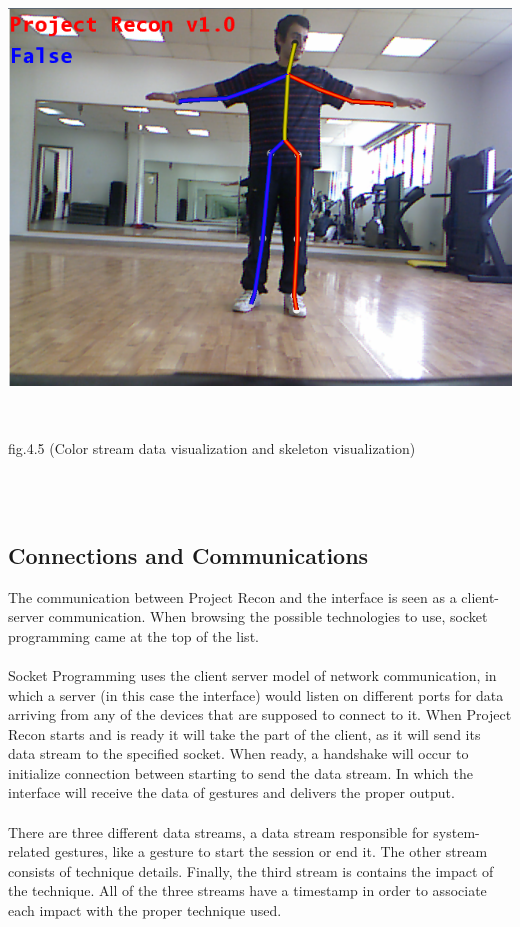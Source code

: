 \\
\\
\centerline{\includegraphics[scale=0.5]{color_skeleton.png}}
\\
\centerline{fig.4.5 (Color stream data visualization and skeleton visualization)}
\\
\\
\subsection{Connections and Communications}
The communication between Project Recon and the interface is seen as a client-server communication. When browsing the possible technologies to use, socket programming came at the top of the list.
\\
\\
Socket Programming uses the client server model of network communication, in which a server (in this case the interface) would listen on different ports for data arriving from any of the devices that are supposed to connect to it. When Project Recon starts and is ready it will take the part of the client, as it will send its data stream to the specified socket. When ready, a handshake will occur to initialize connection between starting to send the data stream. In which the interface will receive the data of gestures and delivers the proper output.
\\
\\
There are three different data streams, a data stream responsible for system-related gestures, like a gesture to start the session or end it. The other stream consists of technique details. Finally, the third stream is contains the impact of the technique. All of the three streams have a timestamp in order to associate each impact with the proper technique used.
